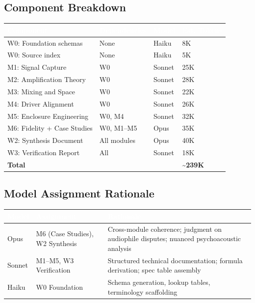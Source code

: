 \documentclass[11pt,letterpaper]{article}
\newcommand{\tableheader}[1]{\textbf{\sffamily\textcolor{white}{#1}}}
\begin{document}
\subsection{Component Breakdown}

\begin{center}
\begin{tabularx}{\textwidth}{L{3cm}L{2.5cm}C{1.5cm}C{2cm}}
\toprule
{}
\tableheader{Component} & \tableheader{Dependencies} & \tableheader{Model} & \tableheader{Est. Tokens} \\
\midrule
W0: Foundation schemas & None & Haiku & 8K \\
W0: Source index & None & Haiku & 5K \\
M1: Signal Capture & W0 & Sonnet & 25K \\
M2: Amplification Theory & W0 & Sonnet & 28K \\
M3: Mixing and Space & W0 & Sonnet & 22K \\
M4: Driver Alignment & W0 & Sonnet & 26K \\
M5: Enclosure Engineering & W0, M4 & Sonnet & 32K \\
M6: Fidelity + Case Studies & W0, M1--M5 & Opus & 35K \\
W2: Synthesis Document & All modules & Opus & 40K \\
W3: Verification Report & All & Sonnet & 18K \\
\midrule
\textbf{Total} & & & \textbf{\textasciitilde239K} \\
\bottomrule
\end{tabularx}
\end{center}

\subsection{Model Assignment Rationale}

\begin{center}
\begin{tabularx}{\textwidth}{L{2cm}L{3.5cm}X}
\toprule
{}
\tableheader{Model} & \tableheader{Assignment} & \tableheader{Rationale} \\
\midrule
Opus & M6 (Case Studies), W2 Synthesis & Cross-module coherence; judgment on audiophile disputes; nuanced psychoacoustic analysis \\
Sonnet & M1--M5, W3 Verification & Structured technical documentation; formula derivation; spec table assembly \\
Haiku & W0 Foundation & Schema generation, lookup tables, terminology scaffolding \\
\bottomrule
\end{tabularx}
\end{center}
\end{document}
